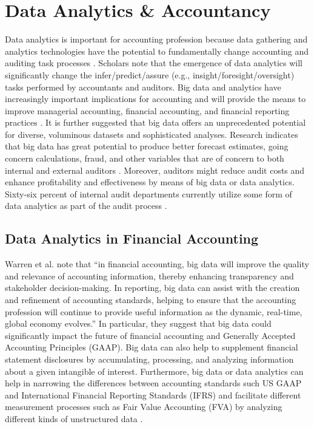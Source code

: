 \documentclass[
]{book}
\begin{document}
\hypertarget{data-analytics-accountancy}{%
\section{Data Analytics \& Accountancy}\label{data-analytics-accountancy}}

Data analytics is important for accounting profession because data gathering and analytics technologies have the potential to fundamentally change accounting and auditing task processes \citep{schneider_infer_2015}. Scholars note that the emergence of data analytics will significantly change the infer/predict/assure (e.g., insight/foresight/oversight) tasks performed by accountants and auditors. Big data and analytics have increasingly important implications for accounting and will provide the means to improve managerial accounting, financial accounting, and financial reporting practices \citep{warren_jr_how_2015}. It is further suggested that big data offers an unprecedented potential for diverse, voluminous datasets and sophisticated analyses. Research indicates that big data has great potential to produce better forecast estimates, going concern calculations, fraud, and other variables that are of concern to both internal and external auditors \citep{alles_drivers_2015}. Moreover, auditors might reduce audit costs and enhance profitability and effectiveness by means of big data or data analytics. Sixty-six percent of internal audit departments currently utilize some form of data analytics as part of the audit process \citep{protiviti_embracing_2017}.

\hypertarget{data-analytics-in-financial-accounting}{%
\subsection{Data Analytics in Financial Accounting}\label{data-analytics-in-financial-accounting}}

Warren et al.\citeyearpar{warren_jr_how_2015} note that ``in financial accounting, big data will improve the quality and relevance of accounting information, thereby enhancing transparency and stakeholder decision-making. In reporting, big data can assist with the creation and refinement of accounting standards, helping to ensure that the accounting profession will continue to provide useful information as the dynamic, real-time, global economy evolves.'' In particular, they suggest that big data could significantly impact the future of financial accounting and Generally Accepted Accounting Principles (GAAP). Big data can also help to supplement financial statement disclosures by accumulating, processing, and analyzing information about a given intangible of interest. Furthermore, big data or data analytics can help in narrowing the differences between accounting standards such US GAAP and International Financial Reporting Standards (IFRS) and facilitate different measurement processes such as Fair Value Accounting (FVA) by analyzing different kinds of unstructured data \citep{warren_jr_how_2015}.
\end{document}
